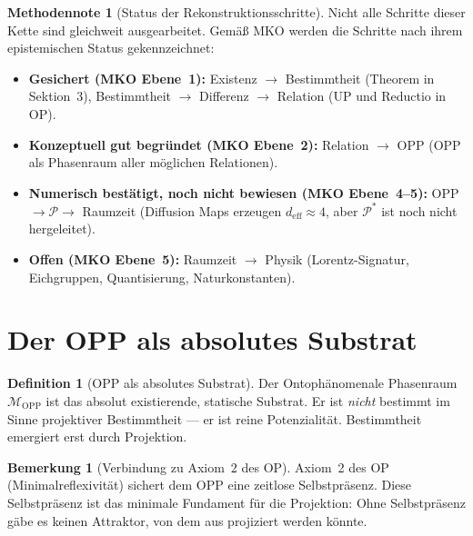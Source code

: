 \documentclass[11pt,a4paper]{article}
\theoremstyle{plain}
\theoremstyle{definition}
\newtheorem{definition}{Definition}[section]
\newtheorem{remark}{Bemerkung}[section]
\newtheorem{methodennote}{Methodennote}[section]
\begin{document}
\begin{methodennote}[Status der Rekonstruktionsschritte]
Nicht alle Schritte dieser Kette sind gleichweit ausgearbeitet.
Gem\"{a}\ss{} MKO werden die Schritte nach ihrem epistemischen Status
gekennzeichnet:

\begin{itemize}
  \item \textbf{Gesichert (MKO Ebene~1):} Existenz $\rightarrow$
        Bestimmtheit (Theorem in Sektion~3), Bestimmtheit $\rightarrow$
        Differenz $\rightarrow$ Relation (UP und Reductio in OP).
  \item \textbf{Konzeptuell gut begr\"{u}ndet (MKO Ebene~2):}
        Relation $\rightarrow$ OPP (OPP als Phasenraum aller m\"{o}glichen
        Relationen).
  \item \textbf{Numerisch best\"{a}tigt, noch nicht bewiesen
        (MKO Ebene~4--5):} OPP $\rightarrow \mathcal{P} \rightarrow$
        Raumzeit (Diffusion Maps erzeugen $d_{\text{eff}} \approx 4$,
        aber $\mathcal{P}^\ast$ ist noch nicht hergeleitet).
  \item \textbf{Offen (MKO Ebene~5):} Raumzeit $\rightarrow$ Physik
        (Lorentz-Signatur, Eichgruppen, Quantisierung, Naturkonstanten).
\end{itemize}
\end{methodennote}

\section{Der OPP als absolutes Substrat}

\begin{definition}[OPP als absolutes Substrat]
Der Ontoph\"{a}nomenale Phasenraum $\mathcal{M}_{\text{OPP}}$ ist das
absolut existierende, statische Substrat. Er ist \emph{nicht} bestimmt
im Sinne projektiver Bestimmtheit --- er ist reine Potenzialit\"{a}t.
Bestimmtheit emergiert erst durch Projektion.
\end{definition}

\begin{remark}[Verbindung zu Axiom~2 des OP]
Axiom~2 des OP (Minimalreflexivit\"{a}t) sichert dem OPP eine zeitlose
Selbstpr\"{a}senz. Diese Selbstpr\"{a}senz ist das minimale Fundament
f\"{u}r die Projektion: Ohne Selbstpr\"{a}senz g\"{a}be es keinen Attraktor,
von dem aus projiziert werden k\"{o}nnte.
\end{remark}
\end{document}

